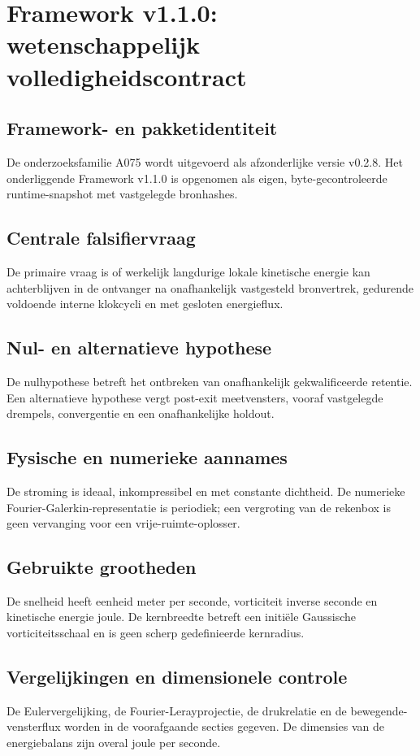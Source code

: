 \documentclass[10pt,a4paper]{article}
\begin{document}
\section{Framework v1.1.0: wetenschappelijk volledigheidscontract}
\subsection{Framework- en pakketidentiteit}
De onderzoeksfamilie A075 wordt uitgevoerd als afzonderlijke versie v0.2.8. Het onderliggende Framework v1.1.0 is opgenomen als eigen, byte-gecontroleerde runtime-snapshot met vastgelegde bronhashes.
\subsection{Centrale falsifiervraag}
De primaire vraag is of werkelijk langdurige lokale kinetische energie kan achterblijven in de ontvanger na onafhankelijk vastgesteld bronvertrek, gedurende voldoende interne klokcycli en met gesloten energieflux.
\subsection{Nul- en alternatieve hypothese}
De nulhypothese betreft het ontbreken van onafhankelijk gekwalificeerde retentie. Een alternatieve hypothese vergt post-exit meetvensters, vooraf vastgelegde drempels, convergentie en een onafhankelijke holdout.
\subsection{Fysische en numerieke aannames}
De stroming is ideaal, inkompressibel en met constante dichtheid. De numerieke Fourier-Galerkin-representatie is periodiek; een vergroting van de rekenbox is geen vervanging voor een vrije-ruimte-oplosser.
\subsection{Gebruikte grootheden}
De snelheid heeft eenheid meter per seconde, vorticiteit inverse seconde en kinetische energie joule. De kernbreedte betreft een initiële Gaussische vorticiteitsschaal en is geen scherp gedefinieerde kernradius.
\subsection{Vergelijkingen en dimensionele controle}
De Eulervergelijking, de Fourier-Lerayprojectie, de drukrelatie en de bewegende-vensterflux worden in de voorafgaande secties gegeven. De dimensies van de energiebalans zijn overal joule per seconde.
\end{document}
